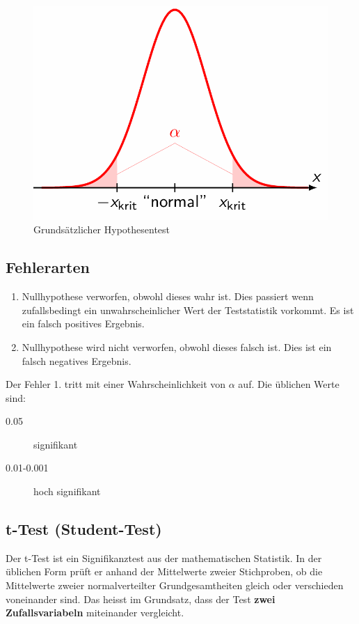 \documentclass[../Main.tex]{subfiles}
\begin{document}
\begin{figure}[H]
    \centering
    \includegraphics[width=0.5\linewidth]{Images/hypo-test.png}
    \caption{Grundsätzlicher Hypothesentest}
\end{figure}

\subsection{Fehlerarten}
\begin{enumerate}
    \item Nullhypothese verworfen, obwohl dieses wahr ist. Dies passiert wenn zufallsbedingt ein unwahrscheinlicher Wert
    der Teststatistik vorkommt. Es ist ein falsch positives Ergebnis.
    \item Nullhypothese wird nicht verworfen, obwohl dieses falsch ist. Dies ist ein falsch negatives Ergebnis.
\end{enumerate}
Der Fehler 1. tritt mit einer Wahrscheinlichkeit von \(\alpha\) auf.
Die üblichen Werte sind:
\begin{description}
    \item[0.05] signifikant
    \item[0.01-0.001] hoch signifikant 
\end{description}

\subsection{t-Test (Student-Test)}
Der t-Test ist ein Signifikanztest aus der mathematischen Statistik.
In der üblichen Form prüft er anhand der Mittelwerte zweier Stichproben, 
ob die Mittelwerte zweier normalverteilter Grundgesamtheiten gleich oder verschieden voneinander sind.
Das heisst im Grundsatz, dass der Test \textbf{zwei Zufallsvariabeln} miteinander vergleicht.
\end{document}
